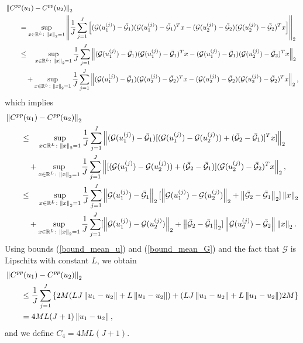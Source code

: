 \begin{align*}
& \left\|C^{pp}(u_1) - C^{pp}(u_2)\right\|_2 \\
& \qquad = \sup_{x \in \mathbb{R}^L \colon \left\|x\right\|_2 = 1} \left \lVert \frac{1}{J} \sum_{j=1}^J \left [ (\mathcal{G}(u_1^{(j)}) - \bar{\mathcal{G}}_1) (\mathcal{G}(u_1^{(j)}) - \bar{\mathcal{G}}_1)^T x - (\mathcal{G}(u_2^{(j)}) - \bar{\mathcal{G}}_2) (\mathcal{G}(u_2^{(j)}) - \bar{\mathcal{G}}_2)^T x \right ] \right \rVert_2 \\
& \qquad \le \quad \sup_{x \in \mathbb{R}^L \colon \left\|x\right\|_2 = 1} \frac{1}{J} \sum_{j=1}^J \left \lVert (\mathcal{G}(u_1^{(j)}) - \bar{\mathcal{G}}_1) (\mathcal{G}(u_1^{(j)}) - \bar{\mathcal{G}}_1)^T x - (\mathcal{G}(u_1^{(j)}) - \bar{\mathcal{G}}_1) (\mathcal{G}(u_2^{(j)}) - \bar{\mathcal{G}}_2)^T x \right \rVert_2 \\
& \qquad \quad + \sup_{x \in \mathbb{R}^L \colon \left\|x\right\|_2 = 1} \frac{1}{J} \sum_{j=1}^J \left \lVert (\mathcal{G}(u_1^{(j)}) - \bar{\mathcal{G}}_1) (\mathcal{G}(u_2^{(j)}) - \bar{\mathcal{G}}_2)^T x - (\mathcal{G}(u_2^{(j)}) - \bar{\mathcal{G}}_2) (\mathcal{G}(u_2^{(j)}) - \bar{\mathcal{G}}_2)^T x \right \rVert_2, 
\end{align*}
which implies
\begin{align*}
& \left\|C^{pp}(u_1) - C^{pp}(u_2)\right\|_2 \\
& \qquad \le \quad \sup_{x \in \mathbb{R}^L \colon \left\|x\right\|_2 = 1} \frac{1}{J} \sum_{j=1}^J \left \lVert (\mathcal{G}(u_1^{(j)}) - \bar{\mathcal{G}}_1) [ (\mathcal{G}(u_1^{(j)}) - \mathcal{G}(u_2^{(j)})) + (\bar{\mathcal{G}}_2 - \bar{\mathcal{G}}_1)]^T x ] \right \rVert_2 \\
& \qquad \quad + \sup_{x \in \mathbb{R}^L \colon \left\|x\right\|_2 = 1} \frac{1}{J} \sum_{j=1}^J \left \lVert [ (\mathcal{G}(u_1^{(j)}) - \mathcal{G}(u_2^{(j)})) + (\bar{\mathcal{G}}_2 - \bar{\mathcal{G}}_1) ] (\mathcal{G}(u_2^{(j)}) - \bar{\mathcal{G}}_2)^T x \right \rVert_2 , \\
& \qquad \le \quad \sup_{x \in \mathbb{R}^L \colon \left\|x\right\|_2 = 1} \frac{1}{J} \sum_{j=1}^J \left\|\mathcal{G}(u_1^{(j)}) - \bar{\mathcal{G}}_1\right\|_2 [ \left\|\mathcal{G}(u_1^{(j)}) - \mathcal{G}(u_2^{(j)})\right\|_2 + \left\|\bar{\mathcal{G}}_2 - \bar{\mathcal{G}}_1\right\|_2 ] \left\|x\right\|_2 \\
& \qquad \quad + \sup_{x \in \mathbb{R}^L \colon \left\|x\right\|_2 = 1} \frac{1}{J} \sum_{j=1}^J [ \left\|\mathcal{G}(u_1^{(j)}) - \mathcal{G}(u_2^{(j)})\right\|_2 + \left\|\bar{\mathcal{G}}_2 - \bar{\mathcal{G}}_1\right\|_2 ] \left\|\mathcal{G}(u_2^{(j)}) - \bar{\mathcal{G}}_2\right\| \left\|x\right\|_2.
\end{align*}
Using bounds (\ref{bound_mean_u}) and (\ref{bound_mean_G}) and the fact that $\mathcal{G}$ is Lipschitz with constant $L$, we obtain
\begin{align*}
& \left\|C^{pp}(u_1) - C^{pp}(u_2)\right\|_2 \\
& \qquad \le \frac{1}{J} \sum_{j=1}^J \left \{ 2M ( LJ \left\|u_1 - u_2\right\| + L \left\|u_1 - u_2\right\| ) + ( LJ \left\|u_1 - u_2\right\| + L \left\|u_1 - u_2\right\| ) 2M \right \} \\
& \qquad = 4 M L (J+1) \left\|u_1 - u_2\right\|,
\end{align*}
and we define $C_4 = 4 M L (J+1)$.

